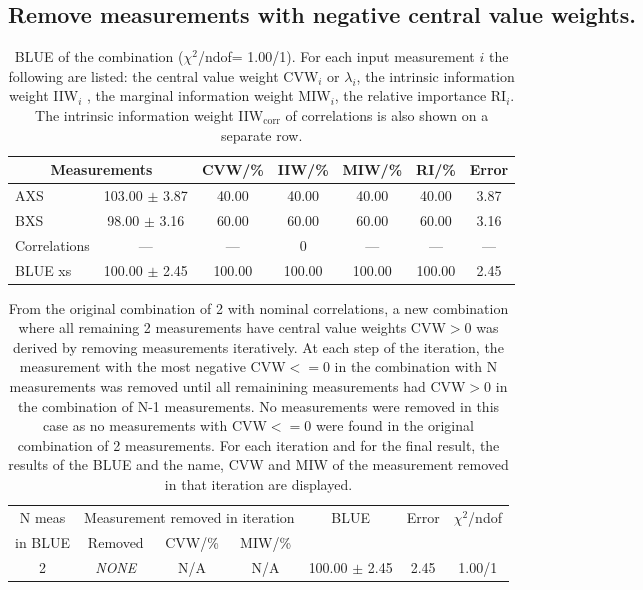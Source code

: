 \subsection{Remove measurements with negative central value weights.}
\begin{table}[H]
\scriptsize
\begin{center}
\renewcommand{\arraystretch}{1.1}
\begin{tabular}{|lc|c|c|c|c|c|}
\hline
\multicolumn{2}{|c|}{Measurements} & CVW/\%  & IIW/\%  & MIW/\%  & RI/\%  & {\tiny Error}\\
\hline
AXS &     103.00 $\pm$       3.87 &      40.00 &      40.00 &      40.00 &      40.00 &       3.87\\
BXS &      98.00 $\pm$       3.16 &      60.00 &      60.00 &      60.00 &      60.00 &       3.16\\
Correlations & --- & --- &  0 & --- & --- & ---\\
\hline
BLUE {\tiny xs} &     100.00 $\pm$       2.45 &     100.00 &     100.00 &     100.00 &     100.00 &       2.45\\
\hline
\end{tabular}
\caption{BLUE of the combination ($\chi^2$/ndof=      1.00/1).
 For each input measurement $i$ the following are listed: the central value weight CVW$_i$ or $\lambda_i$, the intrinsic information weight IIW$_i$ , the marginal information weight MIW$_i$, the relative importance RI$_i$. The intrinsic information weight IIW$_{\mathrm{corr}}$ of correlations is also shown on a separate row.}
\renewcommand{\arraystretch}{1}
\end{center}
\end{table}
\begin{table}[H]
\scriptsize
\begin{center}
\renewcommand{\arraystretch}{1.2}
\begin{tabular}{|c|c|c|c|c|c|c|}
\hline
N {\tiny meas} & \multicolumn{3}{c|}{Measurement removed in iteration} & \multirow{2}{*}{BLUE} & \multirow{2}{*}{\tiny Error} & \multirow{2}{*}{\tiny$\chi^2$/ndof}\\
\cline{2-4}
{\tiny in BLUE} & Removed & CVW/\% & MIW/\% & & & \\\hline
\hline
2 & {\em NONE} & N/A & N/A & 
    100.00 $\pm$      2.45 &       2.45 &       1.00/1 \\
\hline
\end{tabular}
\caption{From the original combination of 2 with nominal correlations, a new combination where all remaining 2 measurements have central value weights CVW$>$0 was derived by removing measurements iteratively. At each step of the iteration, the measurement with the most negative CVW$<=$0 in the combination with N measurements was removed until all remainining measurements had CVW$>$0 in the combination of N-1 measurements. No measurements were removed in this case as no measurements with CVW$<=$0 were found in the original combination of 2 measurements. For each iteration and for the final result, the results of the BLUE and the name, CVW and MIW of the measurement removed in that iteration are displayed.}
\renewcommand{\arraystretch}{1}
\end{center}
\end{table}
